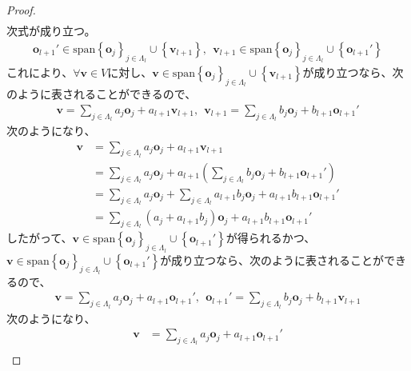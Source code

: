 \documentclass[dvipdfmx]{jsarticle}
\begin{document}
\begin{proof}
\begin{align*}
\end{align*}
次式が成り立つ。
\begin{align*}
\mathbf{o}_{l + 1}' \in \mathrm{span}{\left\{ \mathbf{o}_{j} \right\}_{j \in \varLambda_{l}} \cup \left\{ \mathbf{v}_{l + 1} \right\}},\ \ \mathbf{v}_{l + 1} \in \mathrm{span}{\left\{ \mathbf{o}_{j} \right\}_{j \in \varLambda_{l}} \cup \left\{ \mathbf{o}_{l + 1}' \right\}}
\end{align*}
これにより、$\forall\mathbf{v} \in V$に対し、$\mathbf{v} \in \mathrm{span}{\left\{ \mathbf{o}_{j} \right\}_{j \in \varLambda_{l}} \cup \left\{ \mathbf{v}_{l + 1} \right\}}$が成り立つなら、次のように表されることができるので、
\begin{align*}
\mathbf{v} = \sum_{j \in \varLambda_{l}} {a_{j}\mathbf{o}_{j}} + a_{l + 1}\mathbf{v}_{l + 1},\ \ \mathbf{v}_{l + 1} = \sum_{j \in \varLambda_{l}} {b_{j}\mathbf{o}_{j}} + b_{l + 1}\mathbf{o}_{l + 1}'
\end{align*}
次のようになり、
\begin{align*}
\mathbf{v} &= \sum_{j \in \varLambda_{l}} {a_{j}\mathbf{o}_{j}} + a_{l + 1}\mathbf{v}_{l + 1}\\
&= \sum_{j \in \varLambda_{l}} {a_{j}\mathbf{o}_{j}} + a_{l + 1}\left( \sum_{j \in \varLambda_{l}} {b_{j}\mathbf{o}_{j}} + b_{l + 1}\mathbf{o}_{l + 1}' \right)\\
&= \sum_{j \in \varLambda_{l}} {a_{j}\mathbf{o}_{j}} + \sum_{j \in \varLambda_{l}} {a_{l + 1}b_{j}\mathbf{o}_{j}} + a_{l + 1}b_{l + 1}\mathbf{o}_{l + 1}'\\
&= \sum_{j \in \varLambda_{l}} {\left( a_{j} + a_{l + 1}b_{j} \right)\mathbf{o}_{j}} + a_{l + 1}b_{l + 1}\mathbf{o}_{l + 1}'
\end{align*}
したがって、$\mathbf{v} \in \mathrm{span}{\left\{ \mathbf{o}_{j} \right\}_{j \in \varLambda_{l}} \cup \left\{ \mathbf{o}_{l + 1}' \right\}}$が得られるかつ、$\mathbf{v} \in \mathrm{span}{\left\{ \mathbf{o}_{j} \right\}_{j \in \varLambda_{l}} \cup \left\{ \mathbf{o}_{l + 1}' \right\}}$が成り立つなら、次のように表されることができるので、
\begin{align*}
\mathbf{v} = \sum_{j \in \varLambda_{l}} {a_{j}\mathbf{o}_{j}} + a_{l + 1}\mathbf{o}_{l + 1}',\ \ \mathbf{o}_{l + 1}' = \sum_{j \in \varLambda_{l}} {b_{j}\mathbf{o}_{j}} + b_{l + 1}\mathbf{v}_{l + 1}
\end{align*}
次のようになり、
\begin{align*}
\mathbf{v} &= \sum_{j \in \varLambda_{l}} {a_{j}\mathbf{o}_{j}} + a_{l + 1}\mathbf{o}_{l + 1}'\\

\end{align*}
\end{proof}
\end{document}

